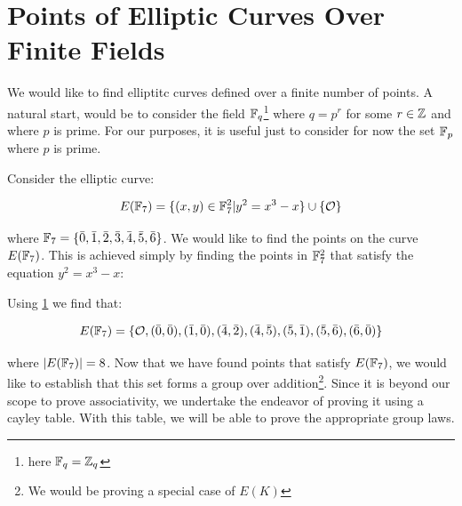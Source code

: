 \section{Points of Elliptic Curves Over Finite Fields}

\hspace{10mm}We would like to find elliptitc curves defined over a finite number of points. A natural start, would be to consider the field $\mathbb{F}_q$\footnote{here $\mathbb{F}_q=\mathbb{Z}_q$} where $q=p^r$ for some $r \in \mathbb{Z}$ and where $p$ is prime. For our purposes, it is useful just to consider for now the set $\mathbb{F}_p$ where $p$ is prime.

Consider the elliptic curve:

\begin{equation*}
    E(\mathbb{F}_7)=\{(x,y) \in \mathbb{F}_7^2 | y^2=x^3-x\}\cup\{\mathcal{O}\}
\end{equation*}

where $\mathbb{F}_7=\{\bar{0},\bar{1},\bar{2},\bar{3},\bar{4},\bar{5},\bar{6}\}$. We would like to find the points on the curve $E(\mathbb{F}_7)$. This is achieved simply by finding the points in $\mathbb{F}_7^2$ that satisfy the equation $y^2=x^3-x$:

        \begin{figure}
            \centering
            
            \caption{}
            \label{fig:EF7Points}
        \end{figure}

Using \ref{fig:EF7Points} we find that:

\begin{equation*}
    E(\mathbb{F}_7)=\{\mathcal{O},(\bar{0},\bar{0}),(\bar{1},\bar{0}),(\bar{4},\bar{2}),(\bar{4},\bar{5}),(\bar{5},\bar{1}),(\bar{5},\bar{6}),(\bar{6},\bar{0})\}
\end{equation*}

where $|E(\mathbb{F}_7)|=8$. Now that we have found points that satisfy $E(\mathbb{F}_7)$, we would like to establish that this set forms a group over addition\footnote{We would be proving a special case of $E(K)$}. Since it is beyond our scope to prove associativity, we undertake the endeavor of proving it using a cayley table. With this table, we will be able to prove the appropriate group laws.

